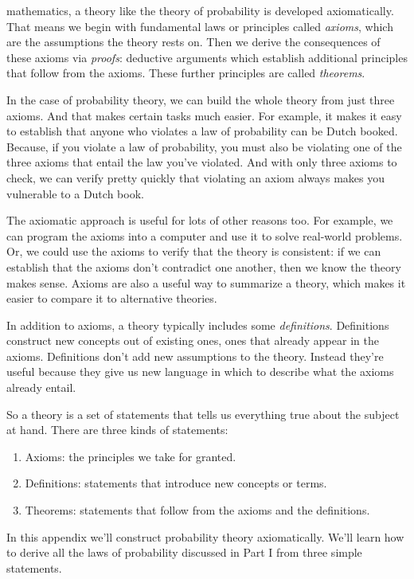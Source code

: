 \documentclass[justified]{tufte-book}
\providecommand{\tightlist}{%
  \setlength{\itemsep}{0pt}\setlength{\parskip}{0pt}}
\theoremstyle{definition}
\theoremstyle{definition}
\theoremstyle{definition}
\theoremstyle{remark}
\begin{document}
 mathematics, a theory like the theory of probability is developed axiomatically. That means we begin with fundamental laws or principles called \emph{axioms}, which are the assumptions the theory rests on. Then we derive the consequences of these axioms via \emph{proofs}: deductive arguments which establish additional principles that follow from the axioms. These further principles are called \emph{theorems}.

In the case of probability theory, we can build the whole theory from just three axioms. And that makes certain tasks much easier. For example, it makes it easy to establish that anyone who violates a law of probability can be Dutch booked. Because, if you violate a law of probability, you must also be violating one of the three axioms that entail the law you've violated. And with only three axioms to check, we can verify pretty quickly that violating an axiom always makes you vulnerable to a Dutch book.

The axiomatic approach is useful for lots of other reasons too. For example, we can program the axioms into a computer and use it to solve real-world problems. Or, we could use the axioms to verify that the theory is consistent: if we can establish that the axioms don't contradict one another, then we know the theory makes sense. Axioms are also a useful way to summarize a theory, which makes it easier to compare it to alternative theories.

In addition to axioms, a theory typically includes some \emph{definitions}. Definitions construct new concepts out of existing ones, ones that already appear in the axioms. Definitions don't add new assumptions to the theory. Instead they're useful because they give us new language in which to describe what the axioms already entail.

So a theory is a set of statements that tells us everything true about the subject at hand. There are three kinds of statements:

\begin{enumerate}
\def\labelenumi{\arabic{enumi}.}
\tightlist
\item
  Axioms: the principles we take for granted.
\item
  Definitions: statements that introduce new concepts or terms.
\item
  Theorems: statements that follow from the axioms and the definitions.
\end{enumerate}

In this appendix we'll construct probability theory axiomatically. We'll learn how to derive all the laws of probability discussed in Part I from three simple statements.
\end{document}
